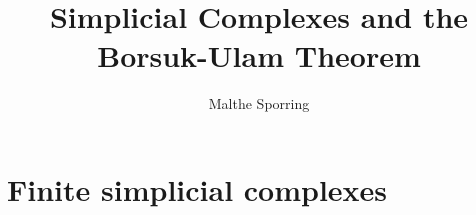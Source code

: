\documentclass[11pt,a4paper]{article}
\title{Simplicial Complexes and the Borsuk-Ulam Theorem}
\author{Malthe Sporring}
\begin{document}
\maketitle

\section{Finite simplicial complexes}

\end{document}
